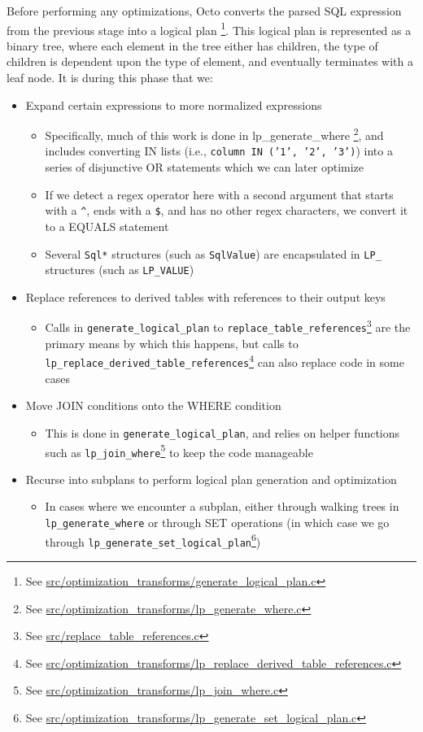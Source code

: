 \documentclass[]{article}
\def\code#1{\texttt{#1}}
\newcommand{\gitlab}[1]{\footnote{See \href{https://gitlab.com/YottaDB/DBMS/YDBOcto/blob/master/#1}{#1}}}
\begin{document}
Before performing any optimizations, Octo converts the parsed SQL expression from the previous stage into a logical plan \gitlab{src/optimization\_transforms/generate\_logical\_plan.c}.
This logical plan is represented as a binary tree, where each element in the tree either has children, the type of children is dependent upon the type of element, and eventually terminates with a leaf node.
It is during this phase that we:

\begin{itemize}
	\item Expand certain expressions to more normalized expressions
	\begin{itemize}
		\item Specifically, much of this work is done in lp\_generate\_where \gitlab{src/optimization\_transforms/lp\_generate\_where.c}, and includes converting IN lists (i.e., \code{column\ IN\ ('1', '2', '3')}) into a series of disjunctive OR statements which we can later optimize
		\item If we detect a regex operator here with a second argument that starts with a \code{\^}, ends with a \code{\$}, and has no other regex characters, we convert it to a EQUALS statement
		\item Several \code{Sql*} structures (such as \code{SqlValue}) are encapsulated in \code{LP\_} structures (such as \code{LP\_VALUE})
	\end{itemize}
	\item Replace references to derived tables with references to their output keys
	\begin{itemize}
		\item Calls in \code{generate\_logical\_plan} to \code{replace\_table\_references}\gitlab{src/replace\_table\_references.c} are the primary means by which this happens, but calls to \\ \code{lp\_replace\_derived\_table\_references}\gitlab{src/optimization\_transforms/lp\_replace\_derived\_table\_references.c} can also replace code in some cases
	\end{itemize}
	\item Move JOIN conditions onto the WHERE condition
	\begin{itemize}
		\item This is done in \code{generate\_logical\_plan}, and relies on helper functions such as \code{lp\_join\_where}\gitlab{src/optimization\_transforms/lp\_join\_where.c} to keep the code manageable
	\end{itemize}
	\item Recurse into subplans to perform logical plan generation and optimization
	\begin{itemize}
		\item In cases where we encounter a subplan, either through walking trees in \code{lp\_generate\_where} or through SET operations (in which case we go through \code{lp\_generate\_set\_logical\_plan}\gitlab{src/optimization\_transforms/lp\_generate\_set\_logical\_plan.c})
	\end{itemize}
\end{itemize}
\end{document}
